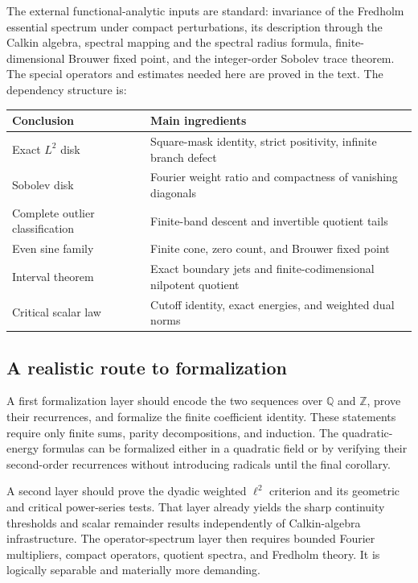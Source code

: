 \documentclass[11pt,a4paper]{article}
\theoremstyle{definition}
\theoremstyle{remark}
\newcommand{\Q}{\mathbb Q}
\newcommand{\Z}{\mathbb Z}
\numberwithin{equation}{section}
\begin{document}
The external functional-analytic inputs are standard: invariance of the
Fredholm essential spectrum under compact perturbations, its description
through the Calkin algebra, spectral mapping and the spectral radius
formula, finite-dimensional Brouwer fixed point, and the integer-order
Sobolev trace theorem. The special operators and estimates needed here
are proved in the text. The dependency structure is:
\begin{center}\small
\begin{tabularx}{\textwidth}{@{}lX@{}}
\toprule
Conclusion & Main ingredients\\
\midrule
Exact $L^2$ disk & Square-mask identity, strict positivity, infinite branch defect\\
Sobolev disk & Fourier weight ratio and compactness of vanishing diagonals\\
Complete outlier classification & Finite-band descent and invertible quotient tails\\
Even sine family & Finite cone, zero count, and Brouwer fixed point\\
Interval theorem & Exact boundary jets and finite-codimensional nilpotent quotient\\
Critical scalar law & Cutoff identity, exact energies, and weighted dual norms\\
\bottomrule
\end{tabularx}
\end{center}

\subsection{A realistic route to formalization}
A first formalization layer should encode the two sequences over $\Q$ and
$\Z$, prove their recurrences, and formalize the finite coefficient identity.
These statements require only finite sums, parity decompositions, and
induction. The quadratic-energy formulas can be formalized either in a
quadratic field or by verifying their second-order recurrences without
introducing radicals until the final corollary.

A second layer should prove the dyadic weighted $\ell^2$ criterion and its
geometric and critical power-series tests. That layer already yields the
sharp continuity thresholds and scalar remainder results independently of
Calkin-algebra infrastructure. The operator-spectrum layer then requires
bounded Fourier multipliers, compact operators, quotient spectra, and
Fredholm theory. It is logically separable and materially more demanding.
\end{document}
